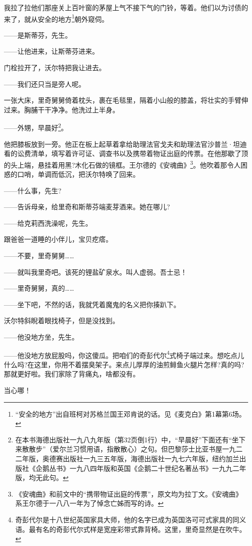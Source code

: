 \par 我拉了拉他们那座关上百叶窗的茅屋上气不接下气的门铃，等着。他们以为讨债的来了，就从安全的地方\footnote{“安全的地方”出自班柯对苏格兰国王邓肯说的话。见《麦克白》第1幕第6场。}朝外窥伺。
\par ——是斯蒂芬，先生。
\par ——让他进来，让斯蒂芬进来。
\par 门栓拉开了，沃尔特把我让进去。
\par ——我们还只当是旁人呢。
\par 一张大床，里奇舅舅倚着枕头，裹在毛毯里，隔着小山般的膝盖，将壮实的手臂伸过来。胸脯干干净净。他洗过上半身。
\par ——外甥，早晨好\footnote{在本书海德出版社一九八九年版（第32页倒1行）中，“早晨好”下面还有“坐下来散散步”（爱尔兰习惯用语，指散散心）之句。但巴黎莎士比亚书屋一九二二年版，奥德赛出版社一九三五年版，海德出版社一九七六年版，纽约加兰出版社《企鹅丛书》一九八四年版和英国《企鹅二十世纪名著丛书》一九九二年版，均无此句。}。
\par 他把膝板放到一旁。他正在板上起草着拿给助理法官戈夫和助理法官沙普兰·坦迪看的讼费清单，填写着许可证、调查书以及携带着物证出庭的传票。在他那歇了顶的头上端，悬挂着用黑?木化石做的镜框。王尔德的《安魂曲》\footnote{《安魂曲》和前文中的“携带物证出庭的传票”，原文均为拉丁文。《安魂曲》系王尔德于一八八一年为了悼念亡姊而写的诗。}。他吹着那令人困惑的口哨，单调而低沉，把沃尔特唤了回来。
\par ——什么事，先生?
\par ——告诉母亲，给里奇和斯蒂芬端麦芽酒来。她在哪儿?
\par ——给克莉西洗澡呢，先生。
\par 跟爸爸一道睡的小伴儿，宝贝疙瘩。
\par ——不要，里奇舅舅……
\par ——就叫我里奇吧。该死的锂盐矿泉水。叫人虚弱。吾士忌！
\par ——里奇舅舅，真的……
\par ——坐下吧，不然的话，我就凭着魔鬼的名义把你揍趴下。
\par 沃尔特斜睨着眼找椅子，但是没找到。
\par ——他没地方坐，先生。
\par ——他没地方放屁股吗，你这傻瓜。把咱们的奇彭代尔\footnote{奇彭代尔是十八世纪英国家具大师，他的名字已成为英国洛可可式家具的同义语。最有名的奇彭代尔式样是宽座彩带式靠背椅。这里，里奇显然是在吹牛。}式椅子端过来。想吃点儿什么吗?在这里，你用不着摆臭架子。来点儿厚厚的油煎鲱鱼火腿片怎样?真的吗?那就更好啦。我们家除了背痛丸，啥都没有。
\par 当心哪！
